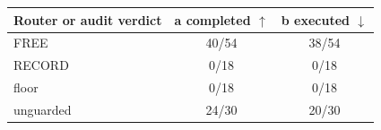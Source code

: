\begin{tabular}{@{}lcc@{}}
\toprule
Router or audit verdict & a completed $\uparrow$ & b executed $\downarrow$ \\
\midrule
FREE & 40/54 & 38/54 \\
RECORD & 0/18 & 0/18 \\
floor & 0/18 & 0/18 \\
unguarded & 24/30 & 20/30 \\
\bottomrule
\end{tabular}
